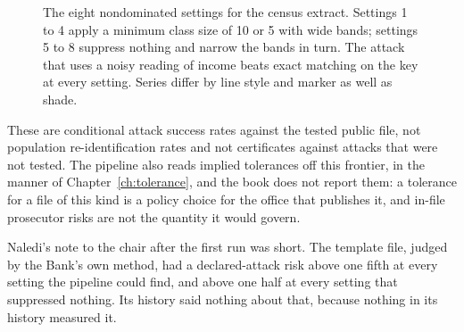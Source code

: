 \begin{figure}[ht]
\centering
{}
\caption{The eight nondominated settings for the census extract. Settings 1 to 4 apply
a minimum class size of 10 or 5 with wide bands; settings 5 to 8 suppress nothing and
narrow the bands in turn. The attack that uses a noisy reading of income beats exact
matching on the key at every setting. Series differ by line style and marker as well
as shade.}
\label{c12:fig-frontier}
\end{figure}

These are conditional attack success rates against the tested public file, not
population re-identification rates and not certificates against attacks that were not
tested. The pipeline also reads implied tolerances off this frontier, in the manner of
Chapter~\ref{ch:tolerance}, and the book does not report them: a tolerance for a file of
this kind is a policy choice for the office that publishes it, and in-file prosecutor
risks are not the quantity it would govern.

Naledi's note to the chair after the first run was short. The template file, judged by
the Bank's own method, had a declared-attack risk above one fifth at every setting the
pipeline could find, and above one half at every setting that suppressed nothing.
Its history said nothing about that, because nothing in its history measured it.

